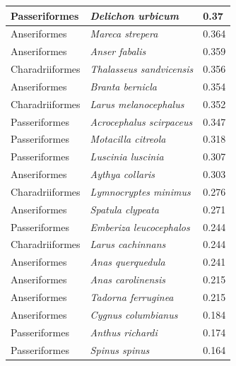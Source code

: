 \documentclass{article}
\begin{document}
\begin{longtable}{|p{} | p{} | p{} |}
  Passeriformes   & \textit{Delichon urbicum}              & 0.37                 \\ \hline
  Anseriformes    & \textit{Mareca strepera}               & 0.364                \\ \hline
  Anseriformes    & \textit{Anser fabalis}                 & 0.359                \\ \hline
  Charadriiformes & \textit{Thalasseus sandvicensis}       & 0.356                \\ \hline
  Anseriformes    & \textit{Branta bernicla}               & 0.354                \\ \hline
  Charadriiformes & \textit{Larus melanocephalus}          & 0.352                \\ \hline
  Passeriformes   & \textit{Acrocephalus scirpaceus}       & 0.347                \\ \hline
  Passeriformes   & \textit{Motacilla citreola}            & 0.318                \\ \hline
  Passeriformes   & \textit{Luscinia luscinia}             & 0.307                \\ \hline
  Anseriformes    & \textit{Aythya collaris}               & 0.303                \\ \hline
  Charadriiformes & \textit{Lymnocryptes minimus}          & 0.276                \\ \hline
  Anseriformes    & \textit{Spatula clypeata}              & 0.271                \\ \hline
  Passeriformes   & \textit{Emberiza leucocephalos}        & 0.244                \\ \hline
  Charadriiformes & \textit{Larus cachinnans}              & 0.244                \\ \hline
  Anseriformes    & \textit{Anas querquedula}              & 0.241                \\ \hline
  Anseriformes    & \textit{Anas carolinensis}             & 0.215                \\ \hline
  Anseriformes    & \textit{Tadorna ferruginea}            & 0.215                \\ \hline
  Anseriformes    & \textit{Cygnus columbianus}            & 0.184                \\ \hline
  Passeriformes   & \textit{Anthus richardi}               & 0.174                \\ \hline
  Passeriformes   & \textit{Spinus spinus}                 & 0.164                \\ \hline

\end{longtable}
\end{document}
